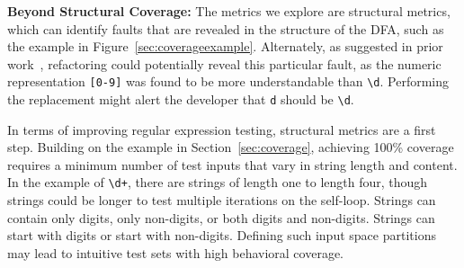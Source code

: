 \textbf{Beyond Structural Coverage: } 
The metrics we explore are structural metrics, which can identify faults that are revealed in the structure of the DFA, such as the example in Figure~\ref{sec:coverageexample}. 
Alternately, as suggested in prior work~\cite{chapman2017exploring}, refactoring could potentially reveal this particular fault, as the numeric representation \verb![0-9]! was found to be more understandable than \verb!\d!. Performing the replacement might alert the developer that \verb!d! should be \verb!\d!. 

In terms of improving regular expression testing, structural metrics are a first step. 
Building on the example in Section~\ref{sec:coverage}, achieving 100\% coverage requires a minimum number of test inputs that vary in string length and content. 
In the example of {\tt \textbackslash d+}, there are strings of length one to length four, though strings could be longer to test multiple iterations on the self-loop. Strings can contain only digits, only non-digits, or both digits and non-digits. Strings can start with digits or start with non-digits. %
Defining such input space partitions may lead to intuitive test sets with high behavioral coverage. 




